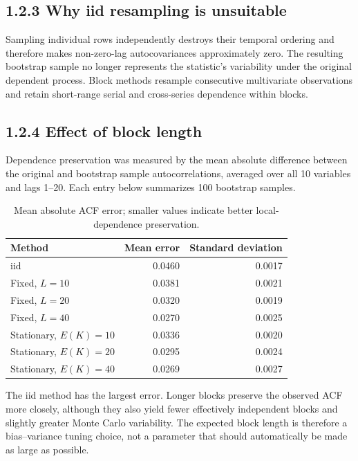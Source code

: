 \documentclass[11pt,a4paper]{article}
\begin{document}
\subsection*{1.2.3 Why iid resampling is unsuitable}

Sampling individual rows independently destroys their temporal ordering and therefore makes
non-zero-lag autocovariances approximately zero.  The resulting bootstrap sample no longer
represents the statistic's variability under the original dependent process.  Block methods
resample consecutive multivariate observations and retain short-range serial and cross-series
dependence within blocks.

\subsection*{1.2.4 Effect of block length}

Dependence preservation was measured by the mean absolute difference between the original
and bootstrap sample autocorrelations, averaged over all 10 variables and lags 1--20.  Each
entry below summarizes 100 bootstrap samples.

\begin{table}[htbp]
  \centering
  \caption{Mean absolute ACF error; smaller values indicate better local-dependence preservation.}
  \begin{tabular}{lrr}
    \toprule
    Method & Mean error & Standard deviation \\
    \midrule
    iid & 0.0460 & 0.0017 \\
    Fixed, $L=10$ & 0.0381 & 0.0021 \\
    Fixed, $L=20$ & 0.0320 & 0.0019 \\
    Fixed, $L=40$ & 0.0270 & 0.0025 \\
    Stationary, $E(K)=10$ & 0.0336 & 0.0020 \\
    Stationary, $E(K)=20$ & 0.0295 & 0.0024 \\
    Stationary, $E(K)=40$ & 0.0269 & 0.0027 \\
    \bottomrule
  \end{tabular}
\end{table}

The iid method has the largest error.  Longer blocks preserve the observed ACF more closely,
although they also yield fewer effectively independent blocks and slightly greater Monte
Carlo variability.  The expected block length is therefore a bias--variance tuning choice,
not a parameter that should automatically be made as large as possible.
\end{document}
